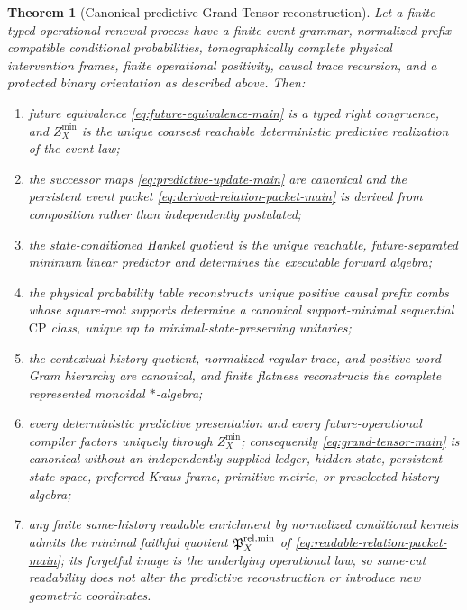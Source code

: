 \documentclass[11pt]{article}
\newtheorem{theorem}{Theorem}[section]
\theoremstyle{definition}
\theoremstyle{remark}
\newcommand{\CP}{\mathrm{CP}}
\begin{document}
\begin{theorem}[Canonical predictive Grand-Tensor reconstruction]
\label{mt:grand-tensor}
Let a finite typed operational renewal process have a finite event grammar,
normalized prefix-compatible conditional probabilities, tomographically
complete physical intervention frames, finite operational positivity, causal
trace recursion, and a protected binary orientation as described above.  Then:
\begin{enumerate}[label=\textup{(\roman*)},leftmargin=2.8em]
\item future equivalence \eqref{eq:future-equivalence-main} is a typed right
      congruence, and $Z_X^{\min}$ is the unique coarsest reachable
      deterministic predictive realization of the event law;
\item the successor maps \eqref{eq:predictive-update-main} are canonical and
      the persistent event packet \eqref{eq:derived-relation-packet-main} is
      derived from composition rather than independently postulated;
\item the state-conditioned Hankel quotient is the unique reachable,
      future-separated minimum linear predictor and determines the executable
      forward algebra;
\item the physical probability table reconstructs unique positive causal
      prefix combs whose square-root supports determine a canonical
      support-minimal sequential $\CP$ class, unique up to
      minimal-state-preserving unitaries;
\item the contextual history quotient, normalized regular trace, and positive
      word-Gram hierarchy are canonical, and finite flatness reconstructs the
      complete represented monoidal $*$-algebra;
\item every deterministic predictive presentation and every future-operational
      compiler factors uniquely through $Z_X^{\min}$; consequently
      \eqref{eq:grand-tensor-main} is canonical without an independently
      supplied ledger, hidden state, persistent state space, preferred Kraus
      frame, primitive metric, or preselected history algebra;
\item any finite same-history readable enrichment by normalized
      conditional kernels admits the minimal faithful quotient
      $\mathfrak P_X^{\rm rel,min}$ of
      \eqref{eq:readable-relation-packet-main}; its forgetful image is the
      underlying operational law, so same-cut readability does not alter the
      predictive reconstruction or introduce new geometric coordinates.
\end{enumerate}
\end{theorem}
\end{document}
